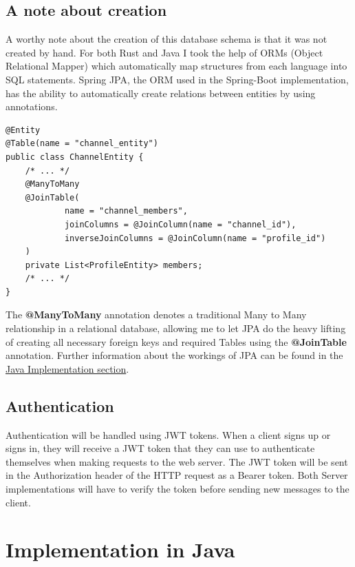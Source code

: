 \documentclass[a4paper,12pt]{article}
\begin{document}
	\subsection*{A note about creation}
	A worthy note about the creation of this database schema is that it was not created by hand. For both Rust and Java I took
	the help of ORMs (Object Relational Mapper) which automatically map structures from each language into SQL statements. Spring
	JPA, the ORM used in the Spring-Boot implementation, has the ability to automatically create relations between entities by using
	annotations.
	\begin{lstlisting}
@Entity
@Table(name = "channel_entity")
public class ChannelEntity {
	/* ... */
	@ManyToMany
	@JoinTable(
			name = "channel_members",
			joinColumns = @JoinColumn(name = "channel_id"),
			inverseJoinColumns = @JoinColumn(name = "profile_id")
	)
	private List<ProfileEntity> members;
	/* ... */
}
	\end{lstlisting}
	The \textbf{@ManyToMany} annotation denotes a traditional Many to Many relationship in a relational database, allowing me to
	let JPA do the heavy lifting of creating all necessary foreign keys and required Tables using the \textbf{@JoinTable} annotation.
	Further information about the workings of JPA can be found in the \hyperref[sec:java_implementation]{Java Implementation section}.

	\subsection{Authentication}
	\label{subsec:authentication}
	Authentication will be handled using JWT tokens. When a client signs up or signs in, they will receive a JWT token that
	they can use to authenticate themselves when making requests to the web server. The JWT token will be sent in the 
	Authorization header of the HTTP request as a Bearer token. Both Server implementations will have to verify the token 
	before sending new messages to the client.

	\section{Implementation in Java}
	\label{sec:java_implementation}
\end{document}

